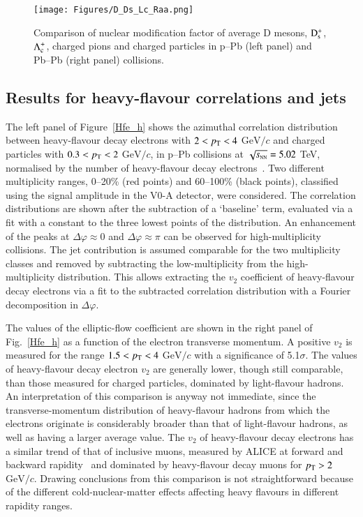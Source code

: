 \documentclass{webofc}
\newcommand{\sqrtsNN}{\sqrt{s_{\rm \scriptscriptstyle NN}}}
\newcommand{\gevc}{\mathrm{GeV}/c}
\newcommand{\pt}{p_{\rm T}}
\newcommand{\Ds}{{\rm D}^+_{\rm s}}
\begin{document}
\begin{figure*}
\centering
\texttt{[image: Figures/D\_Ds\_Lc\_Raa.png]}
\caption{Comparison of nuclear modification factor of average D mesons, $\Ds$, $\Lambda^+_{\rm c}$, charged pions and charged particles in p--Pb (left panel) and Pb--Pb (right panel) collisions.}
\label{D_Ds_Lc}       %
\end{figure*}

\subsection{Results for heavy-flavour correlations and jets}
\label{sub3}
The left panel of Figure~\ref{Hfe_h} shows the azimuthal correlation distribution between heavy-flavour decay electrons with $2 < \pt < 4$ $\gevc$ and charged particles with $0.3 < \pt < 2$ $\gevc$, in p--Pb collisions at $\sqrtsNN = 5.02$ TeV, normalised by the number of heavy-flavour decay electrons~\cite{Acharya:2018dxy}. Two different multiplicity ranges, 0--20\% (red points) and 60--100\% (black points), classified using the signal amplitude in the V0-A detector, were considered. The correlation distributions are shown after the subtraction of a `baseline' term, evaluated via a fit with a constant to the three lowest points of the distribution. An enhancement of the peaks at $\Delta\varphi \approx 0$ and $\Delta\varphi \approx \pi$ can be observed for high-multiplicity collisions. The jet contribution is assumed comparable for the two multiplicity classes and removed by subtracting the low-multiplicity from the high-multiplicity distribution. This allows extracting the $v_2$ coefficient of heavy-flavour decay electrons via a fit to the subtracted correlation distribution with a Fourier decomposition in $\Delta\varphi$.

The values of the elliptic-flow coefficient are shown in the right panel of Fig.~\ref{Hfe_h} as a function of the electron transverse momentum. A positive $v_2$ is measured for the range $1.5 < \pt < 4$ $\gevc$ with a significance of 5.1$\sigma$. The values of heavy-flavour decay electron $v_2$ are generally lower, though still comparable, than those measured for charged particles, dominated by light-flavour hadrons. An interpretation of this comparison is anyway not immediate, since the transverse-momentum distribution of heavy-flavour hadrons from which the electrons originate is considerably broader than that of light-flavour hadrons, as well as having a larger average value.
The $v_2$ of heavy-flavour decay electrons has a similar trend of that of inclusive muons, measured by ALICE at forward and backward rapidity~\cite{Adam:2015bka} and dominated by heavy-flavour decay muons for $\pt > 2$ $\gevc$. Drawing conclusions from this comparison is not straightforward because of the different cold-nuclear-matter effects affecting heavy flavours in different rapidity ranges.
\end{document}
